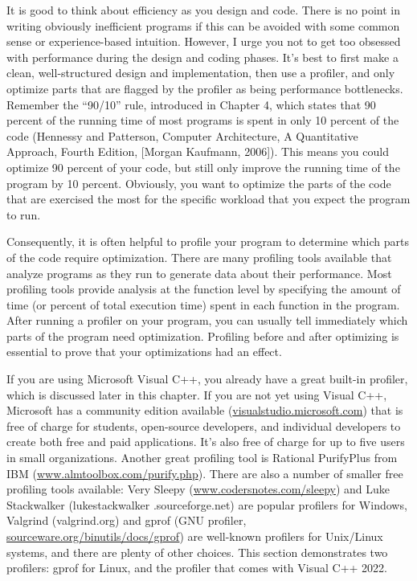 
It is good to think about efficiency as you design and code. There is no point in writing obviously inefficient programs if this can be avoided with some common sense or experience-based intuition. However, I urge you not to get too obsessed with performance during the design and coding phases. It’s best to first make a clean, well-structured design and implementation, then use a profiler, and only optimize parts that are flagged by the profiler as being performance bottlenecks. Remember the “90/10” rule, introduced in Chapter 4, which states that 90 percent of the running time of most programs is spent in only 10 percent of the code (Hennessy and Patterson, Computer Architecture, A Quantitative Approach, Fourth Edition, [Morgan Kaufmann, 2006]). This means you could optimize 90 percent of your code, but still only improve the running time of the program by 10 percent. Obviously, you want to optimize the parts of the code that are exercised the most for the specific workload that you expect the program to run.

Consequently, it is often helpful to profile your program to determine which parts of the code require optimization. There are many profiling tools available that analyze programs as they run to generate data about their performance. Most profiling tools provide analysis at the function level by specifying the amount of time (or percent of total execution time) spent in each function in the program. After running a profiler on your program, you can usually tell immediately which parts of the program need optimization. Profiling before and after optimizing is essential to prove that your optimizations had an effect.

If you are using Microsoft Visual C++, you already have a great built-in profiler, which is discussed later in this chapter. If you are not yet using Visual C++, Microsoft has a community edition available (\url{visualstudio.microsoft.com}) that is free of charge for students, open-source developers, and individual developers to create both free and paid applications. It’s also free of charge for up to five users in small organizations. Another great profiling tool is Rational PurifyPlus from IBM (\url{www.almtoolbox.com/purify.php}). There are also a number of smaller free profiling tools available: Very Sleepy (\url{www.codersnotes.com/sleepy}) and Luke Stackwalker (lukestackwalker .sourceforge.net) are popular profilers for Windows, Valgrind (valgrind.org) and gprof (GNU profiler, \url{sourceware.org/binutils/docs/gprof}) are well-known profilers for Unix/Linux systems, and there are plenty of other choices. This section demonstrates two profilers: gprof for Linux, and the profiler that comes with Visual C++ 2022.

